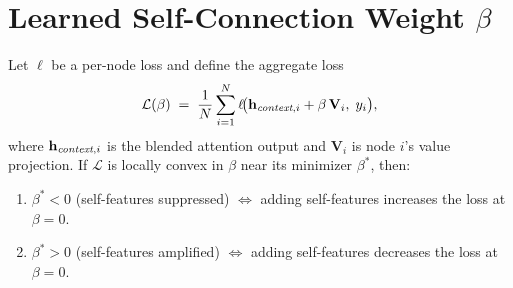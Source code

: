 \section{Learned Self-Connection Weight $\beta$}
\label{app:beta}
\label{app:beta_prop}

\begin{proposition}
\label{prop:beta}
Let $\ell$ be a per-node loss and define the aggregate loss
\[
\mathcal{L}(\beta) \;=\; \frac{1}{N} \sum_{i=1}^{N} \ell\!\bigl(\mathbf{h}_{\emph{context},i} + \beta \, \mathbf{V}_i,\; y_i\bigr),
\]
where $\mathbf{h}_{\emph{context},i}$ is the blended attention output and $\mathbf{V}_i$ is node $i$'s value projection. If $\mathcal{L}$ is locally convex in $\beta$ near its minimizer $\beta^*$, then:
\begin{enumerate}
    \item $\beta^* < 0$ \;\;(self-features suppressed) \;$\iff$\; adding self-features increases the loss at $\beta = 0$.
    \item $\beta^* > 0$ \;\;(self-features amplified) \;$\iff$\; adding self-features decreases the loss at $\beta = 0$.
\end{enumerate}
\end{proposition}

